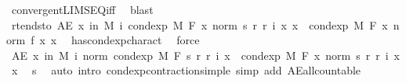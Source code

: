 \begin{isabellebody}
\ convergent{\isacharunderscore}{\kern0pt}LIMSEQ{\isacharunderscore}{\kern0pt}iff\ \isamarkupfalse%
\ blast\isanewline
\ \ \isamarkupfalse%
\ r{\isacharprime}{\kern0pt}{\isacharunderscore}{\kern0pt}tendsto{\isacharcolon}{\kern0pt}\ {\isachardoublequoteopen}AE\ x\ in\ M{\isachardot}{\kern0pt}\ {\isacharparenleft}{\kern0pt}{\isasymlambda}i{\isachardot}{\kern0pt}\ cond{\isacharunderscore}{\kern0pt}exp\ M\ F\ {\isacharparenleft}{\kern0pt}{\isasymlambda}x{\isachardot}{\kern0pt}\ norm\ {\isacharparenleft}{\kern0pt}s\ {\isacharparenleft}{\kern0pt}r\ {\isacharparenleft}{\kern0pt}r{\isacharprime}{\kern0pt}\ i{\isacharparenright}{\kern0pt}{\isacharparenright}{\kern0pt}\ x{\isacharparenright}{\kern0pt}{\isacharparenright}{\kern0pt}\ x{\isacharparenright}{\kern0pt}\ {\isasymlonglonglongrightarrow}\ cond{\isacharunderscore}{\kern0pt}exp\ M\ F\ {\isacharparenleft}{\kern0pt}{\isasymlambda}x{\isachardot}{\kern0pt}\ norm\ {\isacharparenleft}{\kern0pt}f\ x{\isacharparenright}{\kern0pt}{\isacharparenright}{\kern0pt}\ x{\isachardoublequoteclose}\ \isamarkupfalse%
\ has{\isacharunderscore}{\kern0pt}cond{\isacharunderscore}{\kern0pt}exp{\isacharunderscore}{\kern0pt}charact{\isacharparenleft}{\kern0pt}{}{\isacharparenright}{\kern0pt}\ \isamarkupfalse%
\ force\isanewline
\isanewline
\ \ \isamarkupfalse%
\ {\isachardoublequoteopen}AE\ x\ in\ M{\isachardot}{\kern0pt}\ {\isasymforall}i{\isachardot}{\kern0pt}\ norm\ {\isacharparenleft}{\kern0pt}cond{\isacharunderscore}{\kern0pt}exp\ M\ F\ {\isacharparenleft}{\kern0pt}s\ {\isacharparenleft}{\kern0pt}r\ {\isacharparenleft}{\kern0pt}r{\isacharprime}{\kern0pt}\ i{\isacharparenright}{\kern0pt}{\isacharparenright}{\kern0pt}{\isacharparenright}{\kern0pt}\ x{\isacharparenright}{\kern0pt}\ {\isasymle}\ cond{\isacharunderscore}{\kern0pt}exp\ M\ F\ {\isacharparenleft}{\kern0pt}{\isasymlambda}x{\isachardot}{\kern0pt}\ norm\ {\isacharparenleft}{\kern0pt}s\ {\isacharparenleft}{\kern0pt}r\ {\isacharparenleft}{\kern0pt}r{\isacharprime}{\kern0pt}\ i{\isacharparenright}{\kern0pt}{\isacharparenright}{\kern0pt}\ x{\isacharparenright}{\kern0pt}{\isacharparenright}{\kern0pt}\ x{\isachardoublequoteclose}\ \isamarkupfalse%
\ s\ \isamarkupfalse%
\ {\isacharparenleft}{\kern0pt}auto\ intro{\isacharcolon}{\kern0pt}\ cond{\isacharunderscore}{\kern0pt}exp{\isacharunderscore}{\kern0pt}contraction{\isacharunderscore}{\kern0pt}simple\ simp\ add{\isacharcolon}{\kern0pt}\ AE{\isacharunderscore}{\kern0pt}all{\isacharunderscore}{\kern0pt}countable{\isacharparenright}{\kern0pt}\isanewline

\end{isabellebody}
